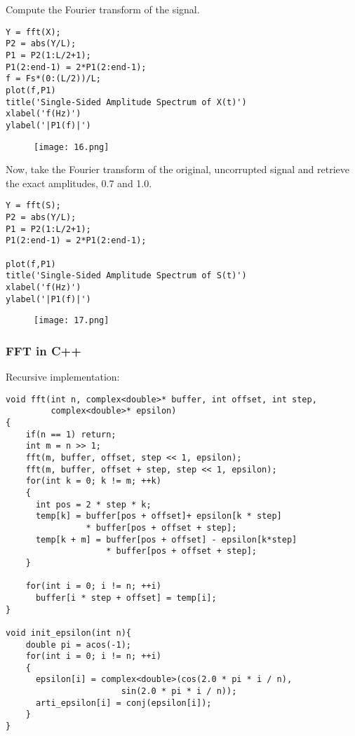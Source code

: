 \documentclass[12pt,a4paper]{article}
\begin{document}
\newpage
Compute the Fourier transform of the signal.
\lstset{language=Matlab}
\begin{lstlisting}
Y = fft(X);
P2 = abs(Y/L);
P1 = P2(1:L/2+1);
P1(2:end-1) = 2*P1(2:end-1);
f = Fs*(0:(L/2))/L;
plot(f,P1) 
title('Single-Sided Amplitude Spectrum of X(t)')
xlabel('f(Hz)')
ylabel('|P1(f)|')
\end{lstlisting}

\begin{figure}[hbtp]
\centering
\texttt{[image: 16.png]}
\end{figure}

Now, take the Fourier transform of the original, uncorrupted signal and retrieve the exact amplitudes, 0.7 and 1.0.
\lstset{language=Matlab}
\begin{lstlisting}
Y = fft(S);
P2 = abs(Y/L);
P1 = P2(1:L/2+1);
P1(2:end-1) = 2*P1(2:end-1);

plot(f,P1) 
title('Single-Sided Amplitude Spectrum of S(t)')
xlabel('f(Hz)')
ylabel('|P1(f)|')
\end{lstlisting}

\begin{figure}[hbtp]
\centering
\texttt{[image: 17.png]}
\end{figure}

\newpage

\subsubsection{FFT in C++}
Recursive implementation:
\lstset{language=C++}
\begin{lstlisting}
void fft(int n, complex<double>* buffer, int offset, int step,
         complex<double>* epsilon) 
{
	if(n == 1) return;
	int m = n >> 1;
	fft(m, buffer, offset, step << 1, epsilon);
	fft(m, buffer, offset + step, step << 1, epsilon);
	for(int k = 0; k != m; ++k)
	{
	  int pos = 2 * step * k;
	  temp[k] = buffer[pos + offset]+ epsilon[k * step] 
		        * buffer[pos + offset + step];
	  temp[k + m] = buffer[pos + offset] - epsilon[k*step] 
	                * buffer[pos + offset + step];
	}

	for(int i = 0; i != n; ++i)
	  buffer[i * step + offset] = temp[i];
}

void init_epsilon(int n){
	double pi = acos(-1);
	for(int i = 0; i != n; ++i)
	{
	  epsilon[i] = complex<double>(cos(2.0 * pi * i / n),
		               sin(2.0 * pi * i / n)); 
	  arti_epsilon[i] = conj(epsilon[i]);
	}
}
\end{lstlisting} 
\end{document}
